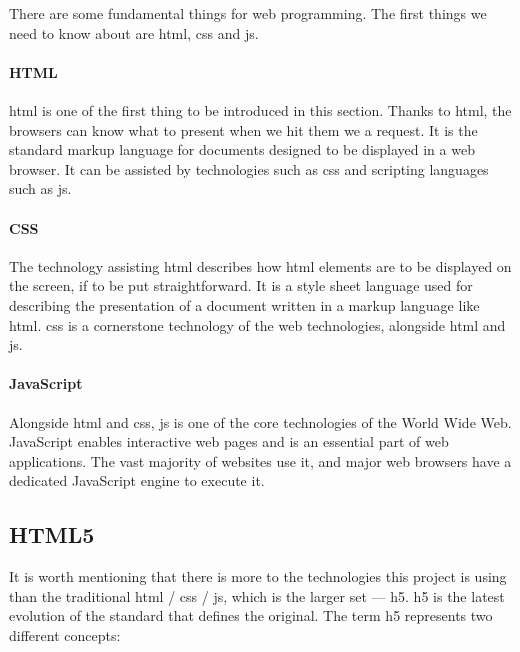 There are some fundamental things for web programming. The first things we need to know about are \gls{html}, \gls{css} and \gls{js}.

\paragraph{HTML}

\gls{html} is one of the first thing to be introduced in this section. Thanks to \gls{html}, the browsers can know what to present when we hit them we a request. It is the standard markup language for documents designed to be displayed in a web browser. It can be assisted by technologies such as \gls{css} and scripting languages such as \gls{js}.\cite{wiki:html}

\paragraph{CSS}


The technology assisting \gls{html} describes how \gls{html} elements are to be displayed on the screen, if to be put straightforward. It is a style sheet language used for describing the presentation of a document written in a markup language like \gls{html}.\cite{wiki:css} \gls{css} is a cornerstone technology of the web technologies, alongside \gls{html} and \gls{js}.\cite{flanagan2006javascript}

\paragraph{JavaScript}


Alongside \gls{html} and \gls{css}, \gls{js} is one of the core technologies of the World Wide Web.\cite{flanagan2006javascript} JavaScript enables interactive web pages and is an essential part of web applications. The vast majority of websites use it,\cite{w3techs2018usage} and major web browsers have a dedicated JavaScript engine to execute it.\cite{wiki:js}

\subsection{HTML5}\label{chap2:html5}

It is worth mentioning that there is more to the technologies this project is using than the traditional \gls{html} / \gls{css} / \gls{js}, which is the larger set --- \gls{h5}. \gls{h5} is the latest evolution of the standard that defines the original. The term \gls{h5} represents two different concepts:

